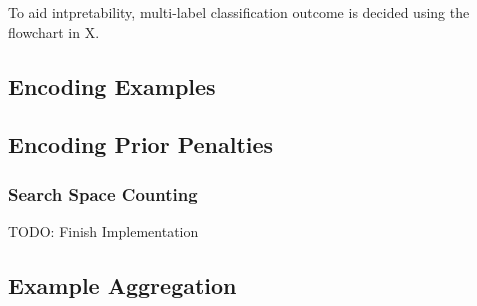 To aid intpretability, multi-label classification outcome is decided using the flowchart in X.
\subsection{Encoding Examples}

\subsection{Encoding Prior Penalties}

\subsubsection{Search Space Counting}
TODO: Finish Implementation

\subsection{Example Aggregation}
